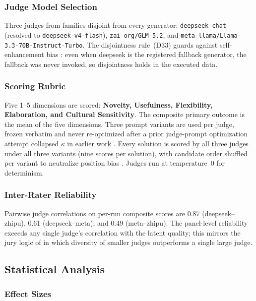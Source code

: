 \documentclass[12pt,a4paper]{article}
\begin{document}
\subsubsection{Judge Model Selection}

Three judges from families disjoint from every generator: \texttt{deepseek-chat}
(resolved to \texttt{deepseek-v4-flash}), \texttt{zai-org/GLM-5.2}, and
\texttt{meta-llama/Llama-3.3-70B-Instruct-Turbo}. The disjointness rule~(D33)
guards against self-enhancement bias \citep{ZhengEtAl2023}: even when deepseek
is the registered fallback generator, the fallback was never invoked, so
disjointness holds in the executed data.

\subsubsection{Scoring Rubric}

Five 1--5 dimensions are scored: \textbf{Novelty, Usefulness, Flexibility,
Elaboration, and Cultural Sensitivity}. The composite
primary outcome is the mean of the five dimensions. Three prompt variants
are used per judge, frozen verbatim and never re-optimized after a prior
judge-prompt optimization attempt collapsed $\kappa$ in earlier work
\citep{Hariri2025a}. Every solution is scored by all three judges under all
three variants (nine scores per solution), with candidate order shuffled per
variant to neutralize position bias \citep{ZhengEtAl2023}. Judges run at
temperature~0 for determinism.

\subsubsection{Inter-Rater Reliability}

Pairwise judge correlations on per-run composite scores are 0.87
(deepseek--zhipu), 0.61 (deepseek--meta), and 0.49 (meta--zhipu). The
panel-level reliability exceeds any single judge's correlation with the latent
quality; this mirrors the jury logic of \citet{VergaEtAl2024} in which diversity
of smaller judges outperforms a single large judge.

\subsection{Statistical Analysis}

\subsubsection{Effect Sizes}
\end{document}
